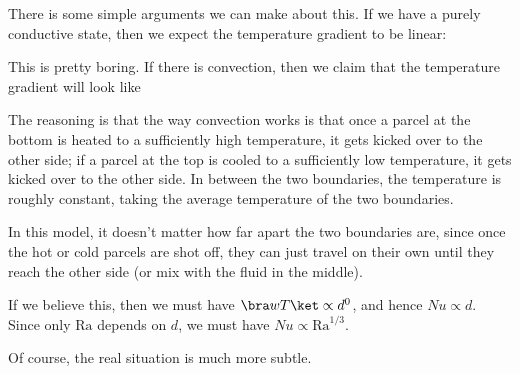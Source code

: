 \documentclass[a4paper]{article}
\newcommand\Ra{\mathrm{Ra}}
\begin{document}
There is some simple arguments we can make about this. If we have a purely conductive state, then we expect the temperature gradient to be linear:
\begin{center}
\end{center}
This is pretty boring. If there is convection, then we claim that the temperature gradient will look like
\begin{center}
\end{center}
The reasoning is that the way convection works is that once a parcel at the bottom is heated to a sufficiently high temperature, it gets kicked over to the other side; if a parcel at the top is cooled to a sufficiently low temperature, it gets kicked over to the other side. In between the two boundaries, the temperature is roughly constant, taking the average temperature of the two boundaries.

In this model, it doesn't matter how far apart the two boundaries are, since once the hot or cold parcels are shot off, they can just travel on their own until they reach the other side (or mix with the fluid in the middle).

If we believe this, then we must have $\bra wT \ket \propto d^0$, and hence $Nu \propto d$. Since only $\Ra$ depends on $d$, we must have $Nu \propto \Ra^{1/3}$.

Of course, the real situation is much more subtle.
\end{document}
